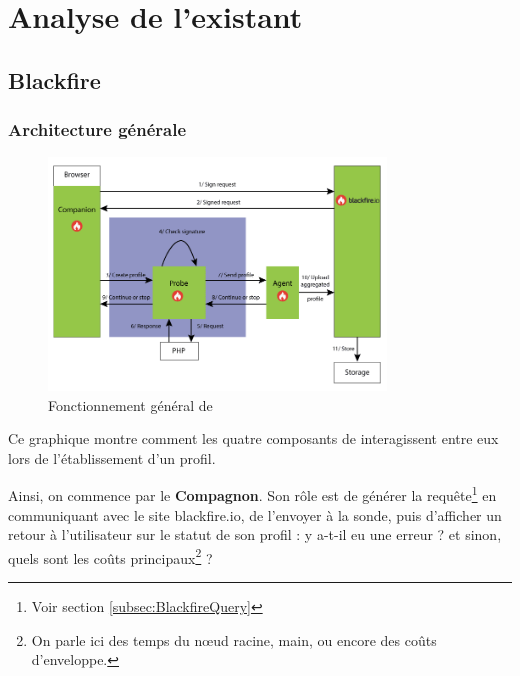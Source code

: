 \part{Analyse de l'existant}
\thispagestyle{part}
\parttoc

	\chapter{Blackfire}
	\label{chap:Blackfire}
		\section{Architecture générale}
	
\begin{figure}[!h]
\begin{center}
  \includegraphics[width=0.8\textwidth]{images/schemas/workflow/general-workflow}
  \caption{Fonctionnement général de \Blackfire}
\end{center}
\end{figure}

Ce graphique montre comment les quatre composants de \Blackfire interagissent entre eux lors de l'établissement d'un profil.
 
Ainsi, on commence par le \textbf{Compagnon}. Son rôle est de générer la requête\footnote{Voir section \vref{subsec:BlackfireQuery}} en communiquant avec le site blackfire.io, de l'envoyer à la sonde, puis d'afficher un retour à l'utilisateur sur le statut de son profil : y a-t-il eu une erreur ? et sinon, quels sont les coûts principaux\footnote{On parle ici des temps du nœud racine, main, ou encore des coûts d'enveloppe.} ?

